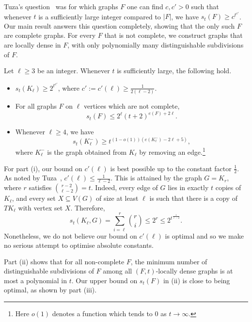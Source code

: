 \documentclass[12pt]{amsart}
\begin{document}
Tuza's question~\cite{tuza2} was for which graphs $F$ one can find $c,c' > 0$ such that whenever $t$ is a sufficiently large integer compared to $|F|$, we have $s_t(F) \geq c^{t^{c'}}$.
Our main result answers this question completely, showing that the only such $F$ are complete graphs. For every $F$ that is not complete, we construct graphs that are locally dense in $F$, with only polynomially many distinguishable subdivisions of $F$. 





\begin{theorem}\label{main}
Let $\ell \geq 3$ be an integer. Whenever $t$ is sufficiently large, the following hold.
\begin{itemize}
\item[(i)] $s_t(K_\ell) \geq 2^{t^{c'}}$, where $c':=c'(\ell) \geq \frac{1}{2(\ell-2)}$.
\item[(ii)] For all graphs $F$ on $\ell$ vertices which are not complete, 
$$s_t(F) \leq  2^\ell(t+2)^{e(F)+2\ell}.$$
\item[(iii)] Whenever $\ell \geq 4$, we have 
$$s_t(K_\ell^-) \geq t^{(1-o(1))(e(K_\ell^-)-2\ell+5)},$$ 
where $K_\ell^-$ is the graph obtained from $K_\ell$ by removing an edge.\footnote{Here $o(1)$ denotes a function which tends to $0$ as $t \to \infty$.}
\end{itemize}
\end{theorem}

For part (i), our bound on $c'(\ell)$ is best possible up to the constant factor $\frac{1}{2}$.
As noted by Tuza~\cite{tuza}, $c'(\ell) \leq \frac{1}{\ell-2}$. This is attained by the graph $G = K_r$, where $r$ satisfies $\binom{r-2}{\ell-2} = t$.
Indeed, every edge of $G$ lies in exactly $t$ copies of $K_\ell$, and every set $X \subseteq V(G)$ of size at least $\ell$ is such that there is a copy of $TK_\ell$ with vertex set $X$.
Therefore,
$$
s_t(K_{\ell},G) = \sum_{i=\ell}^{r} \binom{r}{i} \leq 2^r \leq 2^{t^{\frac{1}{\ell-2}}}.
$$
Nonetheless, we do not believe our bound on $c'(\ell)$ is optimal and so we make no serious attempt to optimise absolute constants.

Part (ii) shows that for all non-complete $F$, the minimum number of distinguishable subdivisions of $F$ among all $(F,t)$-locally dense graphs is at most a polynomial in $t$.
Our upper bound on $s_t(F)$ in (ii) is close to being optimal, as shown by part (iii).


\end{document}
